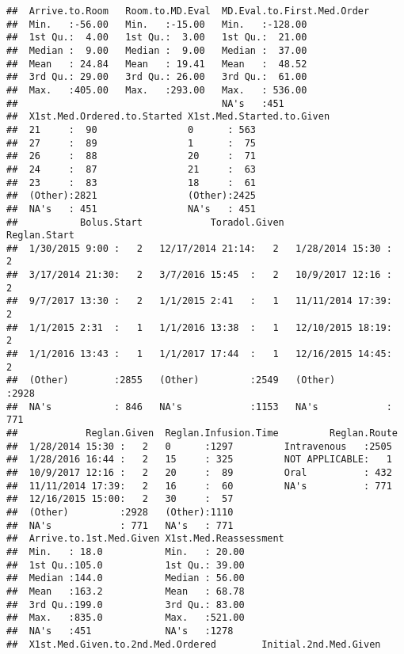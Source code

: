 \documentclass[]{article}
\begin{document}
\begin{verbatim}
##  Arrive.to.Room   Room.to.MD.Eval  MD.Eval.to.First.Med.Order
##  Min.   :-56.00   Min.   :-15.00   Min.   :-128.00           
##  1st Qu.:  4.00   1st Qu.:  3.00   1st Qu.:  21.00           
##  Median :  9.00   Median :  9.00   Median :  37.00           
##  Mean   : 24.84   Mean   : 19.41   Mean   :  48.52           
##  3rd Qu.: 29.00   3rd Qu.: 26.00   3rd Qu.:  61.00           
##  Max.   :405.00   Max.   :293.00   Max.   : 536.00           
##                                    NA's   :451               
##  X1st.Med.Ordered.to.Started X1st.Med.Started.to.Given
##  21     :  90                0      : 563             
##  27     :  89                1      :  75             
##  26     :  88                20     :  71             
##  24     :  87                21     :  63             
##  23     :  83                18     :  61             
##  (Other):2821                (Other):2425             
##  NA's   : 451                NA's   : 451             
##           Bolus.Start            Toradol.Given            Reglan.Start 
##  1/30/2015 9:00 :   2   12/17/2014 21:14:   2   1/28/2014 15:30 :   2  
##  3/17/2014 21:30:   2   3/7/2016 15:45  :   2   10/9/2017 12:16 :   2  
##  9/7/2017 13:30 :   2   1/1/2015 2:41   :   1   11/11/2014 17:39:   2  
##  1/1/2015 2:31  :   1   1/1/2016 13:38  :   1   12/10/2015 18:19:   2  
##  1/1/2016 13:43 :   1   1/1/2017 17:44  :   1   12/16/2015 14:45:   2  
##  (Other)        :2855   (Other)         :2549   (Other)         :2928  
##  NA's           : 846   NA's            :1153   NA's            : 771  
##            Reglan.Given  Reglan.Infusion.Time         Reglan.Route 
##  1/28/2014 15:30 :   2   0      :1297         Intravenous   :2505  
##  1/28/2016 16:44 :   2   15     : 325         NOT APPLICABLE:   1  
##  10/9/2017 12:16 :   2   20     :  89         Oral          : 432  
##  11/11/2014 17:39:   2   16     :  60         NA's          : 771  
##  12/16/2015 15:00:   2   30     :  57                              
##  (Other)         :2928   (Other):1110                              
##  NA's            : 771   NA's   : 771                              
##  Arrive.to.1st.Med.Given X1st.Med.Reassessment
##  Min.   : 18.0           Min.   : 20.00       
##  1st Qu.:105.0           1st Qu.: 39.00       
##  Median :144.0           Median : 56.00       
##  Mean   :163.2           Mean   : 68.78       
##  3rd Qu.:199.0           3rd Qu.: 83.00       
##  Max.   :835.0           Max.   :521.00       
##  NA's   :451             NA's   :1278         
##  X1st.Med.Given.to.2nd.Med.Ordered        Initial.2nd.Med.Given

\end{verbatim}
\end{document}
